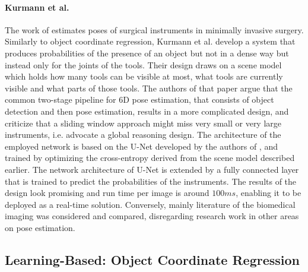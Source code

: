 \paragraph{Kurmann et al.}

The work of \cite{kurmann} estimates poses of surgical instruments in minimally invasive surgery. Similarly to object coordinate regression, Kurmann et al. develop a system that produces probabilities of the presence of an object but not in a dense way but instead only for the joints of the tools. Their design draws on a scene model which holds how many tools can be visible at most, what tools are currently visible and what parts of those tools.
\nnewline 
The authors of that paper argue that the common two-stage pipeline for 6D pose estimation, that consists of object detection and then pose estimation, results in a more complicated design, and criticize that a sliding window approach might miss very small or very large instruments, i.e. advocate a global reasoning design.
\nnewline
The architecture of the employed network is based on the U-Net developed by the authors of \cite{oronneberger}, and trained by optimizing the cross-entropy derived from the scene model described earlier. The network architecture of U-Net is extended by a fully connected layer that is trained to predict the probabilities of the instruments.
\nnewline
The results of the design look promising and run time per image is around $100 ms$, enabling it to be deployed as a real-time solution. Conversely, mainly literature of the biomedical imaging was considered and compared, disregarding research work in other areas on pose estimation.

\subsection{Learning-Based: Object Coordinate Regression}


